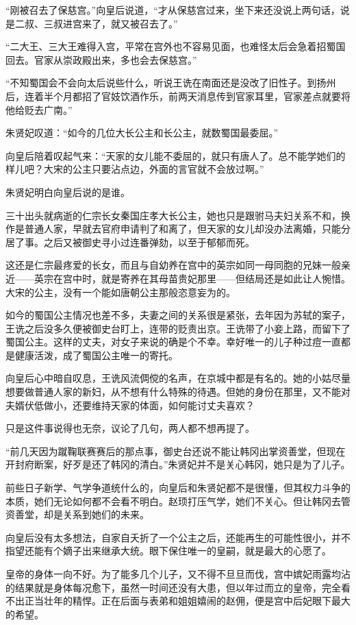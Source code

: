 “刚被召去了保慈宫。”向皇后说道，“才从保慈宫过来，坐下来还没说上两句话，说是二叔、三叔进宫来了，就又被召去了。”

“二大王、三大王难得入宫，平常在宫外也不容易见面，也难怪太后会急着招蜀国回去。官家从崇政殿出来，多也会去保慈宫。”

“不知蜀国会不会向太后说些什么，听说王诜在南面还是没改了旧性子。到扬州后，连着半个月都招了官妓饮酒作乐，前两天消息传到官家耳里，官家差点就要将他给贬去广南。”

朱贤妃叹道：“如今的几位大长公主和长公主，就数蜀国最委屈。”

向皇后陪着叹起气来：“天家的女儿能不委屈的，就只有唐人了。总不能学她们的样儿吧？大宋的公主只要沾点边，外面的言官就不会放过啊。”

朱贤妃明白向皇后说的是谁。

三十出头就病逝的仁宗长女秦国庄孝大长公主，她也只是跟驸马夫妇关系不和，换作是普通人家，早就去官府申请判了和离了，但天家的女儿却没办法离婚，只能分居了事。之后又被御史寻小过连番弹劾，以至于郁郁而死。

这还是仁宗最疼爱的长女，而且与自幼养在宫中的英宗如同一母同胞的兄妹一般亲近——英宗在宫中时，就是寄养在其母苗贵妃那里——但结局还是如此让人惋惜。大宋的公主，没有一个能如唐朝公主那般恣意妄为的。

如今的蜀国公主情况也差不多，夫妻之间的关系很是紧张，去年因为苏轼的案子，王诜之后没多久便被御史台盯上，连带的贬责出京。王诜带了小妾上路，而留下了蜀国公主。这样的丈夫，对女子来说的确是个不幸。幸好唯一的儿子种过痘一直都是健康活泼，成了蜀国公主唯一的寄托。

向皇后心中暗自叹息，王诜风流倜傥的名声，在京城中都是有名的。她的小姑尽量想要做普通人家的新妇，从不想有什么特殊的待遇。但她的身份在那里，又不能对夫婿伏低做小，还要维持天家的体面，如何能讨丈夫喜欢？

只是这件事说得也无奈，议论了几句，两人都不想再提了。

“前几天因为蹴鞠联赛赛后的那点事，御史台还说不能让韩冈出掌资善堂，但现在开封府断案，好歹是还了韩冈的清白。”朱贤妃并不是关心韩冈，她只是为了儿子。

前些日子新学、气学争道统什么的，向皇后和朱贤妃都不是很懂，但其权力斗争的本质，她们无论如何都不会看不明白。赵顼打压气学，她们不关心。但让韩冈去管资善堂，却是关系到她们的未来。

向皇后没有太多想法，自家自夭折了一个公主之后，还能再生的可能性很小，并不指望还能有个嫡子出来继承大统。眼下保住唯一的皇嗣，就是最大的心愿了。

皇帝的身体一向不好。为了能多几个儿子，又不得不旦旦而伐，宫中嫔妃雨露均沾的结果就是身体每况愈下，虽然一时间还没有大患，但以年过而立的皇帝，完全看不出正当壮年的精悍。正在后面与表弟和姐姐嬉闹的赵佣，便是宫中后妃眼下最大的希望。

